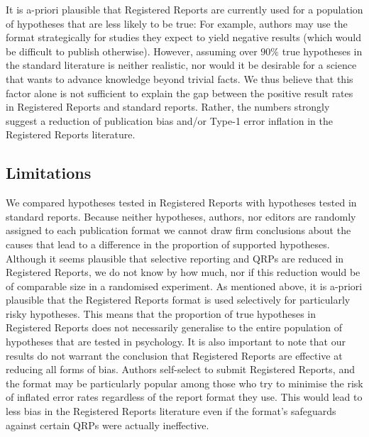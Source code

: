 \documentclass[british,,man,floatsintext]{apa6}
\begin{document}
It is a-priori plausible that Registered Reports are currently used for a population of hypotheses that are less likely to be true:
For example, authors may use the format strategically for studies they expect to yield negative results (which would be difficult to publish otherwise).
However, assuming over \(90\%\) true hypotheses in the standard literature is neither realistic, nor would it be desirable for a science that wants to advance knowledge beyond trivial facts.
We thus believe that this factor alone is not sufficient to explain the gap between the positive result rates in Registered Reports and standard reports.
Rather, the numbers strongly suggest a reduction of publication bias and/or Type-1 error inflation in the Registered Reports literature.

\hypertarget{limitations}{%
\subsection{Limitations}\label{limitations}}

We compared hypotheses tested in Registered Reports with hypotheses tested in standard reports.
Because neither hypotheses, authors, nor editors are randomly assigned to each publication format we cannot draw firm conclusions about the causes that lead to a difference in the proportion of supported hypotheses.
Although it seems plausible that selective reporting and QRPs are reduced in Registered Reports, we do not know by how much, nor if this reduction would be of comparable size in a randomised experiment.
As mentioned above, it is a-priori plausible that the Registered Reports format is used selectively for particularly risky hypotheses.
This means that the proportion of true hypotheses in Registered Reports does not necessarily generalise to the entire population of hypotheses that are tested in psychology.
It is also important to note that our results do not warrant the conclusion that Registered Reports are effective at reducing all forms of bias.
Authors self-select to submit Registered Reports, and the format may be particularly popular among those who try to minimise the risk of inflated error rates regardless of the report format they use.
This would lead to less bias in the Registered Reports literature even if the format's safeguards against certain QRPs were actually ineffective.
\end{document}
